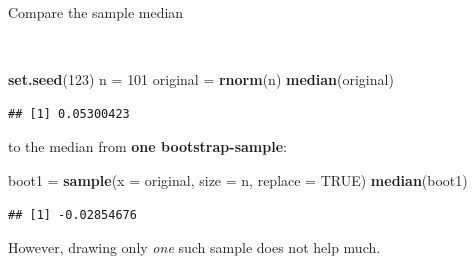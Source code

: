 \documentclass[
  10pt,
  ignorenonframetext,
]{beamer}
\newenvironment{Shaded}{\begin{snugshade}}{\end{snugshade}}
\newcommand{\AttributeTok}[1]{\textcolor[rgb]{0.13,0.29,0.53}{#1}}
\newcommand{\ConstantTok}[1]{\textcolor[rgb]{0.56,0.35,0.01}{#1}}
\newcommand{\DecValTok}[1]{\textcolor[rgb]{0.00,0.00,0.81}{#1}}
\newcommand{\FunctionTok}[1]{\textcolor[rgb]{0.13,0.29,0.53}{\textbf{#1}}}
\newcommand{\NormalTok}[1]{#1}
\newcommand{\OtherTok}[1]{\textcolor[rgb]{0.56,0.35,0.01}{#1}}
\begin{document}
\begin{frame}[fragile]
Compare the sample median

\(~\)

\scriptsize

\begin{Shaded}
\begin{Highlighting}[]
\FunctionTok{set.seed}\NormalTok{(}\DecValTok{123}\NormalTok{)}
\NormalTok{n }\OtherTok{=} \DecValTok{101}
\NormalTok{original }\OtherTok{=} \FunctionTok{rnorm}\NormalTok{(n)}
\FunctionTok{median}\NormalTok{(original)}
\end{Highlighting}
\end{Shaded}

\begin{verbatim}
## [1] 0.05300423
\end{verbatim}

\normalsize

to the median from \textbf{one bootstrap-sample}: \scriptsize

\begin{Shaded}
\begin{Highlighting}[]
\NormalTok{boot1 }\OtherTok{=} \FunctionTok{sample}\NormalTok{(}\AttributeTok{x =}\NormalTok{ original, }\AttributeTok{size =}\NormalTok{ n, }\AttributeTok{replace =} \ConstantTok{TRUE}\NormalTok{)}
\FunctionTok{median}\NormalTok{(boot1)}
\end{Highlighting}
\end{Shaded}

\begin{verbatim}
## [1] -0.02854676
\end{verbatim}

\normalsize

However, drawing only \emph{one} such sample does not help much.
\end{frame}
\end{document}
